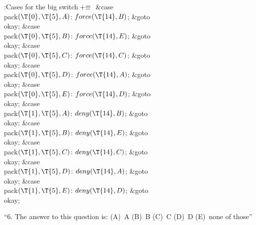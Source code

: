 \Y\B\4:Cases for the big switch\X${}\mathrel+\equiv{}$\6
\4\&{case} \\{pack}${}(\T{0},\39\T{5},\39\|A){}$:\5
${}\\{force}(\T{14},\39\|B){}$;\5
\&{goto} \\{okay};\6
\4\&{case} \\{pack}${}(\T{0},\39\T{5},\39\|B){}$:\5
${}\\{force}(\T{14},\39\|E){}$;\5
\&{goto} \\{okay};\6
\4\&{case} \\{pack}${}(\T{0},\39\T{5},\39\|C){}$:\5
${}\\{force}(\T{14},\39\|C){}$;\5
\&{goto} \\{okay};\6
\4\&{case} \\{pack}${}(\T{0},\39\T{5},\39\|D){}$:\5
${}\\{force}(\T{14},\39\|A){}$;\5
\&{goto} \\{okay};\6
\4\&{case} \\{pack}${}(\T{0},\39\T{5},\39\|E){}$:\5
${}\\{force}(\T{14},\39\|D){}$;\5
\&{goto} \\{okay};\6
\4\&{case} \\{pack}${}(\T{1},\39\T{5},\39\|A){}$:\5
${}\\{deny}(\T{14},\39\|B){}$;\5
\&{goto} \\{okay};\6
\4\&{case} \\{pack}${}(\T{1},\39\T{5},\39\|B){}$:\5
${}\\{deny}(\T{14},\39\|E){}$;\5
\&{goto} \\{okay};\6
\4\&{case} \\{pack}${}(\T{1},\39\T{5},\39\|C){}$:\5
${}\\{deny}(\T{14},\39\|C){}$;\5
\&{goto} \\{okay};\6
\4\&{case} \\{pack}${}(\T{1},\39\T{5},\39\|D){}$:\5
${}\\{deny}(\T{14},\39\|A){}$;\5
\&{goto} \\{okay};\6
\4\&{case} \\{pack}${}(\T{1},\39\T{5},\39\|E){}$:\5
${}\\{deny}(\T{14},\39\|D){}$;\5
\&{goto} \\{okay};\par
\fi

``6. The answer to this question is:
(A)~A (B)~B (C)~C (D)~D (E)~none of those''

